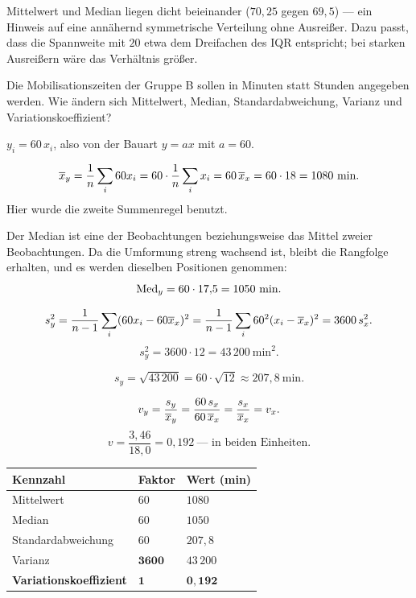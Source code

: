 \begin{aufgabe}
Mittelwert und Median liegen dicht beieinander ($70{,}25$ gegen $69{,}5$) --- ein Hinweis auf eine annähernd symmetrische Verteilung ohne Ausreißer. Dazu passt, dass die Spannweite mit $20$ etwa dem Dreifachen des IQR entspricht; bei starken Ausreißern wäre das Verhältnis größer.
\end{aufgabe}

\begin{aufgabe}
Die Mobilisationszeiten der Gruppe B sollen in Minuten statt Stunden angegeben werden. Wie ändern sich Mittelwert, Median, Standardabweichung, Varianz und Variationskoeffizient?

\loesung
{}
$y_i = 60\,x_i$, also von der Bauart $y = a x$ mit $a = 60$.

\[ \MW_y = \frac{1}{n}\sum_i 60 x_i = 60 \cdot \frac{1}{n}\sum_i x_i = 60\,\MW_x = 60 \cdot 18 = 1080 \ \text{min} . \]
Hier wurde die zweite Summenregel benutzt.

Der Median ist eine der Beobachtungen beziehungsweise das Mittel zweier Beobachtungen. Da die Umformung streng wachsend ist, bleibt die Rangfolge erhalten, und es werden dieselben Positionen genommen:
\[ \operatorname{Med}_y = 60 \cdot 17{,}5 = 1050 \ \text{min} . \]

\[ s_y^2 = \frac{1}{n-1}\sum_i (60x_i - 60\overline{x}_x)^2 = \frac{1}{n-1}\sum_i 60^2 (x_i-\overline{x}_x)^2 = 3600\,s_x^2 . \]
\[ s_y^2 = 3600 \cdot 12 = 43\,200 \ \text{min}^2 . \]

\[ s_y = \sqrt{43\,200} = 60 \cdot \sqrt{12} \approx 207{,}8 \ \text{min} . \]

\[ v_y = \frac{s_y}{\overline{x}_y} = \frac{60\,s_x}{60\,\overline{x}_x} = \frac{s_x}{\overline{x}_x} = v_x . \]
\[ v = \frac{3{,}46}{18{,}0} = 0{,}192 \ \text{--- in beiden Einheiten}. \]

\begin{center}
{\small
\renewcommand{\arraystretch}{1.45}
\begin{tabular}{@{}P{3.4cm}P{2.0cm}P{2.6cm}@{}}
\toprule
\textbf{Kennzahl} & \textbf{Faktor} & \textbf{Wert (min)}\\
\midrule
Mittelwert & $60$ & $1080$\\
Median & $60$ & $1050$\\
Standard\-abweichung & $60$ & $207{,}8$\\
Varianz & $\mathbf{3600}$ & $43\,200$\\
\textbf{Variationskoeffizient} & $\mathbf{1}$ & \textcolor{gruen}{$\mathbf{0{,}192}$}\\
\bottomrule
\end{tabular}}
\end{center}


\end{aufgabe}
